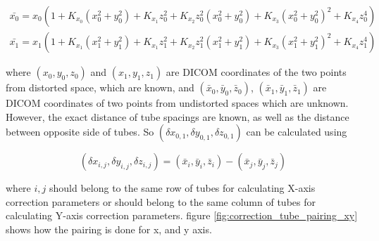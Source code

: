 \begin{eqnarray} \label{eq:xy_setup_sample}
\bar{x_0} = x_0(1 + K_{x_0}(x_0^2 + y_0^2) + K_{x_1}z_0^2 + K_{x_2}z_0^2(x_0^2 + y_0^2) 
+ K_{x_3}(x_0^2 + y_0^2)^2 + K_{x_4}z_0^4)  \\
\bar{x_1} = x_1(1 + K_{x_1}(x_1^2 + y_1^2) + K_{x_1}z_1^2 + K_{x_2}z_1^2(x_1^2 + y_1^2) 
+ K_{x_3}(x_1^2 + y_1^2)^2 + K_{x_4}z_1^4) 
\end{eqnarray}

where $(x_0, y_0, z_0)$ and $(x_1, y_1, z_1)$ are DICOM coordinates of the two points from distorted space, 
which are known, and $(\bar{x}_0, \bar{y}_0, \bar{z}_0)$, $(\bar{x}_1, \bar{y}_1, \bar{z}_1)$ are DICOM 
coordinates of two points from undistorted spaces which are unknown. However, the exact distance of tube
spacings are known, as well as the distance between opposite side of tubes. So 
$(\delta{x}_{0,1}, \delta{y}_{0,1}, \delta{z}_{0,1})$ can be calculated using 

\begin{equation}
  (\delta{x}_{i,j}, \delta{y}_{i,j}, \delta{z}_{i,j}) = 
  (\bar{x}_i, \bar{y}_i, \bar{z}_i) - (\bar{x}_j, \bar{y}_j, \bar{z}_j)
\end{equation}

where $i, j$ should belong to the same row of tubes for calculating X-axis correction parameters 
or should belong to the same column of tubes for calculating Y-axis correction parameters. 
figure \ref{fig:correction_tube_pairing_xy} shows how the pairing is done for x, and y axis. 

